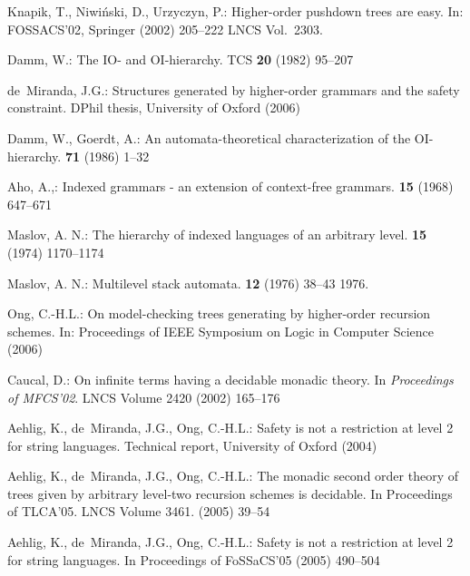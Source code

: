 \documentclass{llncs}
\begin{document}
\begin{thebibliography}{10}

Knapik, T., Niwi{\'n}ski, D., Urzyczyn, P.:
\newblock Higher-order pushdown trees are easy.
\newblock In: FOSSACS'02, Springer (2002)  205--222 LNCS Vol.~2303.

Damm, W.:
\newblock The {IO-} and {OI}-hierarchy.
\newblock TCS \textbf{20} (1982)  95--207

de~Miranda, J.G.:
\newblock Structures generated by higher-order grammars and the safety
  constraint.
\newblock DPhil thesis, University of Oxford (2006)

Damm, W., Goerdt, A.:
\newblock An automata-theoretical characterization of the {OI}-hierarchy.
 \textbf{71} (1986) 1--32

Aho, A.,:
\newblock Indexed grammars - an extension of context-free grammars.
 \textbf{15} (1968) 647--671

Maslov, A. N.:
\newblock The hierarchy of indexed languages of an arbitrary level.
 \textbf{15} (1974) 1170--1174

Maslov, A. N.:
\newblock Multilevel stack automata.
 \textbf{12} (1976) 38--43 1976.

Ong, C.-H.L.:
\newblock On model-checking trees generating by higher-order recursion schemes.
\newblock In: Proceedings of IEEE Symposium on Logic in Computer Science
(2006)

Caucal, D.:
\newblock On infinite terms having a decidable monadic theory.
\newblock In {\em Proceedings of MFCS'02}. LNCS Volume 2420 (2002) 165--176

Aehlig, K., de~Miranda, J.G., Ong, C.-H.L.:
\newblock Safety is not a restriction at level 2 for string languages.
\newblock Technical report, University of Oxford (2004)

Aehlig, K., de~Miranda, J.G., Ong, C.-H.L.:
\newblock The monadic second order theory of trees given by arbitrary level-two
  recursion schemes is decidable.
\newblock In Proceedings of TLCA'05. LNCS Volume 3461. (2005)  39--54

Aehlig, K., de~Miranda, J.G., Ong, C.-H.L.:
\newblock Safety is not a restriction at level 2 for string languages.
\newblock In Proceedings of FoSSaCS'05 (2005)  490--504


\end{thebibliography}
\end{document}
